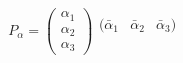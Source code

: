 \begin{equation}
P_\alpha 
	= 		\left( \begin{array}{c}
 	\alpha_1 \\
	\alpha_2 \\
	\alpha_3 
	\end{array}\right)
\begin{array}{ccc} 
(\bar\alpha_1 & \bar\alpha_2 & \bar\alpha_3) \\
    &    &    \\
     &    &    
	\end{array}            \label{eq:alti}
\end{equation}

